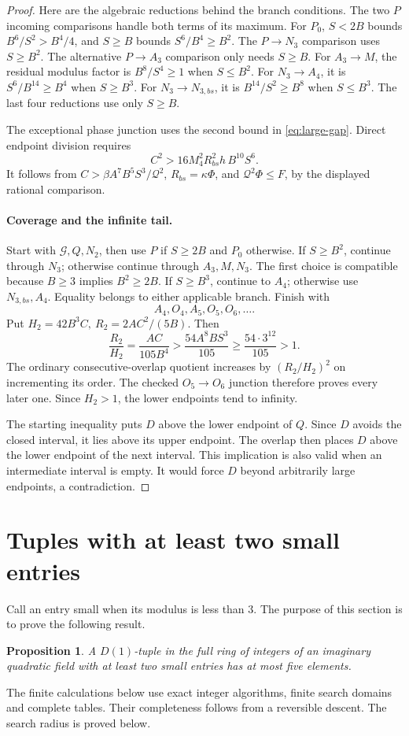 \documentclass[12pt]{article}
\newtheorem{proposition}[theorem]{Proposition}
\numberwithin{equation}{section}
\begin{document}
\begin{proof}
Here are the algebraic reductions behind the branch conditions.
The two \(P\) incoming comparisons handle both terms of its maximum.
For \(P_0\), \(S<2B\) bounds \(B^6/S^2>B^4/4\), and \(S\ge B\)
bounds \(S^6/B^4\ge B^2\). The $P\to N_3$ comparison uses $S\ge B^2$.
The alternative $P\to A_3$ comparison only needs $S\ge B$.
For \(A_3\to M\), the residual modulus factor is \(B^8/S^4\ge1\)
when \(S\le B^2\). For \(N_3\to A_4\), it is \(S^6/B^{14}\ge B^4\)
when \(S\ge B^3\). For \(N_3\to N_{3,bs}\), it is
\(B^{14}/S^2\ge B^8\) when \(S\le B^3\).
The last four reductions use only $S\ge B$.

The exceptional phase junction uses the second bound in
\eqref{eq:large-gap}. Direct endpoint division requires
\[
 C^2>16M_4^2R_{bs}^2h\,B^{10}S^6.
\]
It follows from \(C>\beta A^7B^5S^3/\mathcal Q^2\),
\(R_{bs}=\kappa\Phi\), and \(\mathcal Q^2\Phi\le F\), by the
displayed rational comparison.

\paragraph{Coverage and the infinite tail.}
Start with \(\mathcal G,Q,N_2\), then use \(P\) if \(S\ge2B\) and
\(P_0\) otherwise. If \(S\ge B^2\), continue through \(N_3\);
otherwise continue through \(A_3,M,N_3\). The first choice is compatible
because \(B\ge3\) implies \(B^2\ge2B\).
If \(S\ge B^3\), continue to \(A_4\); otherwise use \(N_{3,bs},A_4\).
Equality belongs to either applicable branch. Finish with
\[
 A_4,O_4,A_5,O_5,O_6,\ldots .
\]
Put \(H_2=42B^3C,\ R_2=2AC^2/(5B)\). Then
\[
 \frac{R_2}{H_2}=\frac{AC}{105B^4}>
 \frac{54A^8BS^3}{105}\ge\frac{54\cdot3^{12}}{105}>1.
\]
The ordinary consecutive-overlap quotient increases by
\((R_2/H_2)^2\) on incrementing its order. The checked \(O_5\to O_6\)
junction therefore proves every later one. Since \(H_2>1\), the lower
endpoints tend to infinity.

The starting inequality puts \(D\) above the lower endpoint of \(Q\).
Since $D$ avoids the closed interval, it lies above its upper endpoint.
The overlap then places $D$ above the lower endpoint of the next interval.
This implication is also valid when an intermediate interval is empty.
It would force \(D\) beyond arbitrarily large endpoints, a contradiction.
\end{proof}

\section{Tuples with at least two small entries}\label{sec:small-entries}
Call an entry small when its modulus is less than $3$.
The purpose of this section is to prove the following result.
\begin{proposition}\label{sm:main}
A $D(1)$-tuple in the full ring of integers of an imaginary quadratic
field with at least two small entries has at most five elements.
\end{proposition}
The finite calculations below use exact integer algorithms, finite
search domains and complete tables. Their completeness follows from a
reversible descent. The search radius is proved below.
\end{document}
